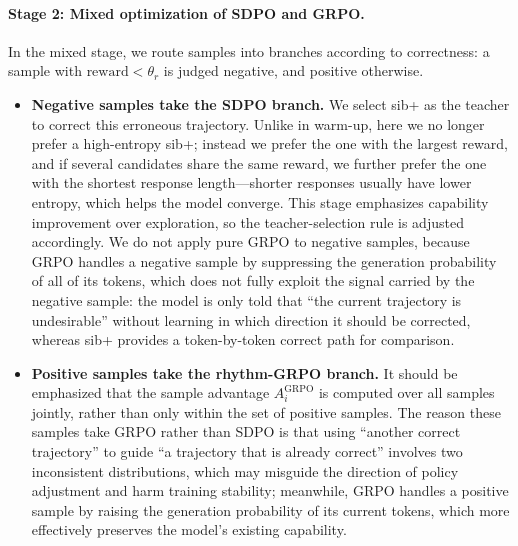 \documentclass{article}
\begin{document}
\paragraph{Stage 2: Mixed optimization of SDPO and GRPO.}
In the mixed stage, we route samples into branches according to correctness: a sample with $\text{reward}<\theta_r$ is judged negative, and positive otherwise.
\begin{itemize}
  \item \textbf{Negative samples take the SDPO branch.} We select sib+ as the teacher to correct this erroneous trajectory. Unlike in warm-up, here we no longer prefer a high-entropy sib+; instead we prefer the one with the largest reward, and if several candidates share the same reward, we further prefer the one with the shortest response length---shorter responses usually have lower entropy, which helps the model converge. This stage emphasizes capability improvement over exploration, so the teacher-selection rule is adjusted accordingly. We do not apply pure GRPO to negative samples, because GRPO handles a negative sample by suppressing the generation probability of all of its tokens, which does not fully exploit the signal carried by the negative sample: the model is only told that ``the current trajectory is undesirable'' without learning in which direction it should be corrected, whereas sib+ provides a token-by-token correct path for comparison.
  \item \textbf{Positive samples take the rhythm-GRPO branch.} It should be emphasized that the sample advantage $A_i^{\text{GRPO}}$ is computed over all samples jointly, rather than only within the set of positive samples. The reason these samples take GRPO rather than SDPO is that using ``another correct trajectory'' to guide ``a trajectory that is already correct'' involves two inconsistent distributions, which may misguide the direction of policy adjustment and harm training stability; meanwhile, GRPO handles a positive sample by raising the generation probability of its current tokens, which more effectively preserves the model's existing capability.
\end{itemize}
\end{document}
